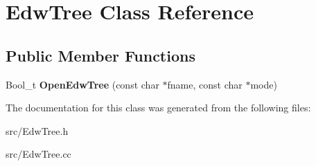 \hypertarget{class_edw_tree}{
\section{EdwTree Class Reference}
\label{class_edw_tree}
}
\subsection*{Public Member Functions}
\begin{DoxyCompactItemize}
\item 
\hypertarget{class_edw_tree_af697789186ccd40a8daa07a55cf77f99}{
Bool\_\-t {\bfseries OpenEdwTree} (const char $\ast$fname, const char $\ast$mode)}
\label{class_edw_tree_af697789186ccd40a8daa07a55cf77f99}

\end{DoxyCompactItemize}


The documentation for this class was generated from the following files:\begin{DoxyCompactItemize}
\item 
src/EdwTree.h\item 
src/EdwTree.cc\end{DoxyCompactItemize}
